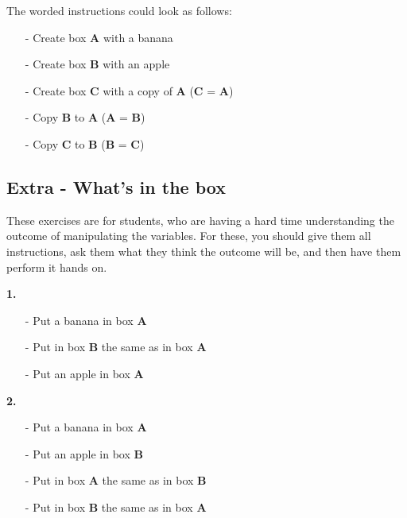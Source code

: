 The worded instructions could look as follows:
\begin{itemize}
    \item[-] Create box \textbf{A} with a banana
    \item[-] Create box \textbf{B} with an apple
    \item[-] Create box \textbf{C} with a copy of \textbf{A} (\textbf{C} = \textbf{A})
    \item[-] Copy \textbf{B} to \textbf{A} (\textbf{A} = \textbf{B}) 
    \item[-] Copy \textbf{C} to \textbf{B} (\textbf{B} = \textbf{C})
\end{itemize}




\subsection{Extra - What's in the box}
These exercises are for students, who are having a hard time understanding the outcome of manipulating the variables. For these, you should give them all instructions, ask them what they think the outcome will be, and then have them perform it hands on.

\textbf{1. }
\begin{itemize}
    \item[-] Put a banana in box \textbf{A}
	\item[-] Put in box \textbf{B} the same as in box \textbf{A}
    \item[-] Put an apple in box \textbf{A}
\end{itemize}

\textbf{2. }
\begin{itemize}
    \item[-] Put a banana in box \textbf{A}
    \item[-] Put an apple in box \textbf{B}
	\item[-] Put in box \textbf{A} the same as in box \textbf{B}
    \item[-] Put in box \textbf{B} the same as in box \textbf{A}
\end{itemize}

\newpage